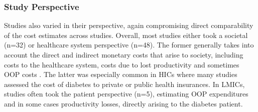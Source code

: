 \documentclass[12pt,english]{article}
\begin{document}
\subsubsection{Study Perspective}
Studies also varied in their perspective, again compromising direct comparability of the cost estimates across studies. Overall, most studies either took a societal (n=32) or healthcare system perspective (n=48). The former generally takes into account the direct and indirect monetary costs that arise to society, including costs to the healthcare system, costs due to lost productivity and sometimes \ac{OOP} costs \parencite{Segel2006}. The latter was especially common in \acp{HIC} where many studies assessed the cost of diabetes to private or public health insurances. In \acp{LMIC}, studies often took the patient perspective (n=5), estimating \ac{OOP} expenditures and in some cases productivity losses, directly arising to the diabetes patient.
\end{document}
